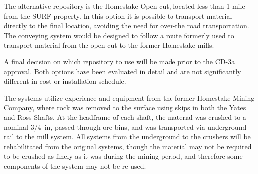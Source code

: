 The alternative repository is the Homestake Open cut, located less than 1 mile from the SURF property.  In this option it is possible %
to transport material directly to the final location, avoiding the need for over-the road transportation.  The conveying system would be designed to follow a route formerly used to transport material from the open cut to the former Homestake mills. 

A final decision on which repository to use will be made prior to the CD-3a approval.  Both options have been evaluated in detail and are not significantly different in cost or installation schedule.  %

The systems utilize experience and equipment from the former Homestake Mining Company, %
where rock was removed to the surface using skips in both the Yates and Ross Shafts. At the headframe of each shaft, the material was crushed to a nominal $3/4$~in, passed through ore bins, and was transported via underground rail to the mill system. All systems from the underground to the crushers will be rehabilitated from the original systems, though the material may not be required to be crushed as finely as it was during the mining period, and therefore some components of the system may not be re-used.




